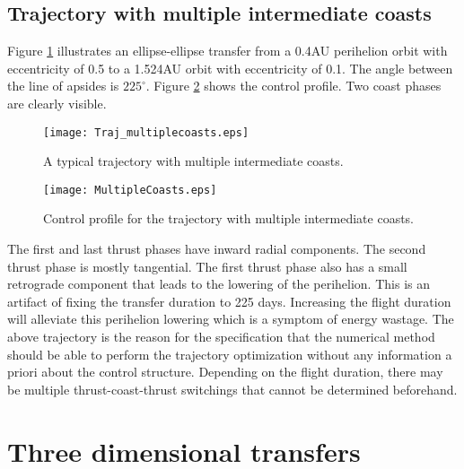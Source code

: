 \subsection{Trajectory with multiple intermediate coasts}
Figure \ref{Multcoasts} illustrates an ellipse-ellipse transfer from a 0.4AU perihelion orbit with eccentricity of 0.5 to a 1.524AU orbit with eccentricity of 0.1. The angle between the line of apsides is $225^\circ$. Figure \ref{Multcoasts_angle} shows the control profile. Two coast phases are clearly visible. 
\begin{figure}[H]
	\centering\texttt{[image: Traj\_multiplecoasts.eps]}
	\caption{A typical trajectory with multiple intermediate coasts.}
	\label{Multcoasts}
\end{figure}
\begin{figure}[H]
	\centering\texttt{[image: MultipleCoasts.eps]}
	\caption{Control profile for the trajectory with multiple intermediate coasts.}
	\label{Multcoasts_angle}
\end{figure}
The first and last thrust phases have inward radial components. The second thrust phase is mostly tangential. The first thrust phase also has a small retrograde component that leads to the lowering of the perihelion. This is an artifact of fixing the transfer duration to 225 days. Increasing the flight duration will alleviate this perihelion lowering which is a symptom of energy wastage. The above trajectory is the reason for the specification that the numerical method should be able to perform the trajectory optimization without any information a priori about the control structure. Depending on the flight duration, there may be multiple thrust-coast-thrust switchings that cannot be determined beforehand. 
\section{Three dimensional transfers}
